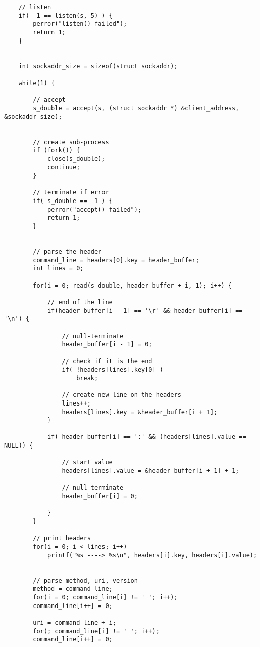 \begin{lstlisting}
    // listen
    if( -1 == listen(s, 5) ) {
        perror("listen() failed");
        return 1;
    }


    int sockaddr_size = sizeof(struct sockaddr);

    while(1) {
        
        // accept
        s_double = accept(s, (struct sockaddr *) &client_address, &sockaddr_size);


        // create sub-process
        if (fork()) {
            close(s_double);
            continue;
        }

        // terminate if error
        if( s_double == -1 ) {
            perror("accept() failed");
            return 1;
        }


        // parse the header
        command_line = headers[0].key = header_buffer;
        int lines = 0;

        for(i = 0; read(s_double, header_buffer + i, 1); i++) {

            // end of the line
            if(header_buffer[i - 1] == '\r' && header_buffer[i] == '\n') {
                
                // null-terminate
                header_buffer[i - 1] = 0;

                // check if it is the end
                if( !headers[lines].key[0] )
                    break;

                // create new line on the headers
                lines++;
                headers[lines].key = &header_buffer[i + 1];
            }

            if( header_buffer[i] == ':' && (headers[lines].value == NULL)) {
                
                // start value
                headers[lines].value = &header_buffer[i + 1] + 1;

                // null-terminate
                header_buffer[i] = 0;

            }
        }

        // print headers
        for(i = 0; i < lines; i++)
            printf("%s ----> %s\n", headers[i].key, headers[i].value);
        

        // parse method, uri, version
        method = command_line;
        for(i = 0; command_line[i] != ' '; i++);
        command_line[i++] = 0;

        uri = command_line + i;
        for(; command_line[i] != ' '; i++);
        command_line[i++] = 0;


\end{lstlisting}
